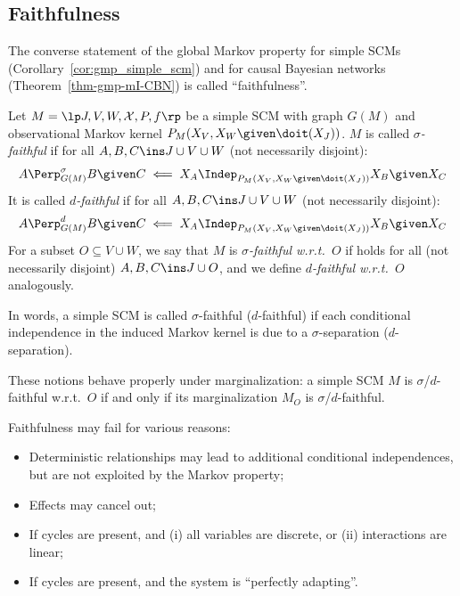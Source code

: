 \subsection{Faithfulness}

The converse statement of the global Markov property for simple SCMs (Corollary~\ref{cor:gmp_simple_scm})
and for causal Bayesian networks (Theorem~\ref{thm-gmp-mI-CBN}) is called ``faithfulness''.
\begin{Def}
  Let $M = \lt \Sin, \Send, \Srnd, \CX, P, f \rt$ be a simple SCM with graph $G(M)$
  and observational Markov kernel $P_{M}(X_V,X_W \given \doit(X_J))$.
  $M$ is called \emph{$\sigma$-faithful} if 
  for all $A, B, C \ins J \cup V \cup W$ (not necessarily disjoint):
  \begin{equation}\label{eq:sigma_faithful}
    A \Perp^\sigma_{G(M)} B \given C \impliedby X_A \Indep_{P_{M}(X_V,X_W \given \doit(\XJ))} X_B \given X_C
  \end{equation}
  It is called \emph{$d$-faithful} if
  for all $A, B, C \ins J \cup V \cup W$ (not necessarily disjoint):
  \begin{equation}\label{eq:d_faithful}
    A \Perp^d_{G(M)} B \given C \impliedby X_A \Indep_{P_{M}(X_V,X_W \given \doit(\XJ))} X_B \given X_C
  \end{equation}
  For a subset $O \subseteq V \cup W$, we say that $M$ is \emph{$\sigma$-faithful w.r.t.\ $O$} if
   holds for all (not necessarily disjoint) $A, B, C \ins J \cup O$, and we define
  \emph{$d$-faithful w.r.t.\ $O$} analogously.
\end{Def}
In words, a simple SCM is called $\sigma$-faithful ($d$-faithful) if each conditional independence in the induced Markov kernel
is due to a $\sigma$-separation ($d$-separation).
\begin{Rem}
These notions behave properly under marginalization: a simple SCM $M$ is $\sigma$/$d$-faithful w.r.t.\ $O$ if and only if
its marginalization $M_O$ is $\sigma$/$d$-faithful.
\end{Rem}

Faithfulness may fail for various reasons:
\begin{itemize}
  \item Deterministic relationships may lead to additional conditional independences, but are not exploited by the Markov property;
  \item Effects may cancel out;
  \item If cycles are present, and (i) all variables are discrete, or (ii) interactions are linear;
  \item If cycles are present, and the system is ``perfectly adapting''.
\end{itemize}

